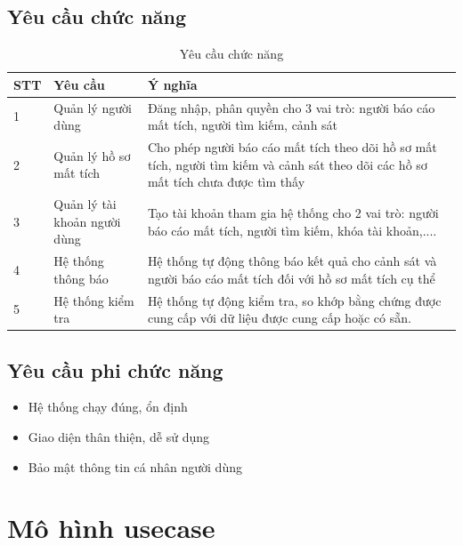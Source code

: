 \documentclass[../DoAn.tex]{subfiles}
\begin{document}
\subsection{Yêu cầu chức năng}
\begin{table}[H]
	\centering{}
	\begin{tabular}{p{1cm}p{5cm}p{7cm}}
		\hline
		\textbf{STT} & \textbf{Yêu cầu}             & \textbf{Ý nghĩa}                                                                                                                   \\ \hline
		1            & Quản lý người dùng           & Đăng nhập, phân quyền cho 3 vai trò: người báo cáo mất tích, người tìm kiếm, cảnh sát                                              \\ \hline
		2            & Quản lý hồ sơ mất tích       & Cho phép người báo cáo mất tích theo dõi hồ sơ mất tích, người tìm kiếm và cảnh sát theo dõi các hồ sơ mất tích chưa được tìm thấy \\ \hline
		3            & Quản lý tài khoản người dùng & Tạo tài khoản tham gia hệ thống cho 2 vai trò: người báo cáo mất tích, người tìm kiếm, khóa tài khoản,....
		\\ \hline
		4            & Hệ thống thông báo           & Hệ thống tự động thông báo kết quả cho cảnh sát và người báo cáo mất tích đối với hồ sơ mất tích cụ thể
		\\ \hline
		5            & Hệ thống kiểm tra            & Hệ thống tự động kiểm tra, so khớp bằng chứng được cung cấp với dữ liệu được cung cấp hoặc có sẵn.
		\\ \hline
	\end{tabular}
	\caption{Yêu cầu chức năng}
\end{table}
\subsection{Yêu cầu phi chức năng}
\begin{itemize}
	\item Hệ thống chạy đúng, ổn định
	\item Giao diện thân thiện, dễ sử dụng
	\item Bảo mật thông tin cá nhân người dùng
\end{itemize}
\section{Mô hình usecase}
\end{document}
